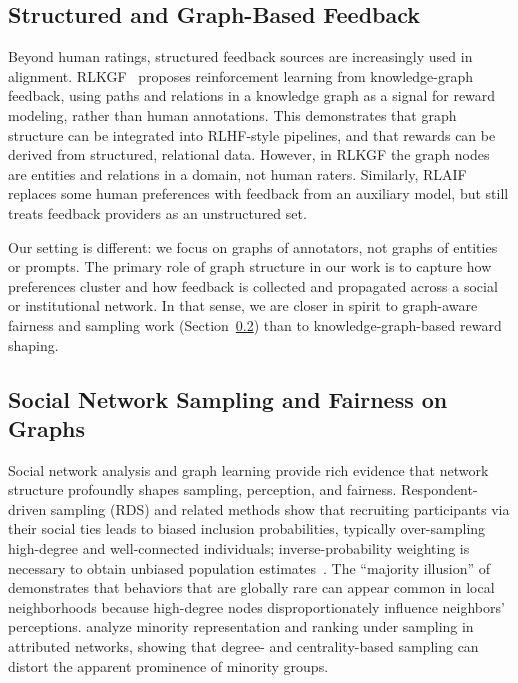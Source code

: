 \documentclass{article}
\theoremstyle{plain}
\theoremstyle{definition}
\theoremstyle{remark}
\begin{document}
\subsection{Structured and Graph-Based Feedback}
\label{sec:rw_graph_feedback}

Beyond human ratings, structured feedback sources are increasingly used in alignment.
RLKGF~\citep{yan2025rlkgf} proposes reinforcement learning from knowledge-graph feedback, using paths and relations in a knowledge graph as a signal for reward modeling, rather than human annotations.
This demonstrates that graph structure can be integrated into RLHF-style pipelines, and that rewards can be derived from structured, relational data.
However, in RLKGF the graph nodes are entities and relations in a domain, not human raters.
Similarly, RLAIF~\citep{lee2024rlaif} replaces some human preferences with feedback from an auxiliary model, but still treats feedback providers as an unstructured set.

Our setting is different: we focus on graphs of annotators, not graphs of entities or prompts.
The primary role of graph structure in our work is to capture how preferences cluster and how feedback is collected and propagated across a social or institutional network.
In that sense, we are closer in spirit to graph-aware fairness and sampling work (Section~\ref{sec:rw_network_bias}) than to knowledge-graph-based reward shaping.

\subsection{Social Network Sampling and Fairness on Graphs}
\label{sec:rw_network_bias}

Social network analysis and graph learning provide rich evidence that network structure profoundly shapes sampling, perception, and fairness.
Respondent-driven sampling (RDS) and related methods show that recruiting participants via their social ties leads to biased inclusion probabilities, typically over-sampling high-degree and well-connected individuals; inverse-probability weighting is necessary to obtain unbiased population estimates~\citep{wejnert2010rds}.
The ``majority illusion'' of \citet{lerman2016majorityillusion} demonstrates that behaviors that are globally rare can appear common in local neighborhoods because high-degree nodes disproportionately influence neighbors’ perceptions.
\citet{antunes2024minorityranking} analyze minority representation and ranking under sampling in attributed networks, showing that degree- and centrality-based sampling can distort the apparent prominence of minority groups.
\end{document}
